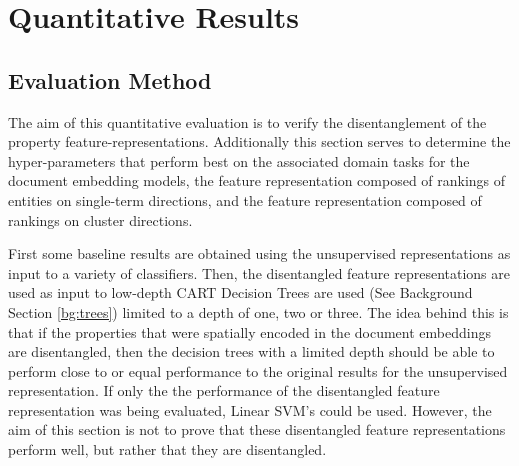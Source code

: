 

\section{Quantitative Results}

\subsection{Evaluation Method}

The aim of this quantitative evaluation is to verify the disentanglement of the property feature-representations. Additionally this section serves to determine the hyper-parameters that perform best on the associated domain tasks for the document embedding models, the feature representation composed of rankings of entities on single-term directions, and the feature representation composed of rankings on cluster directions. 

First some baseline results are obtained using the unsupervised representations as input to a variety of classifiers. Then,  the disentangled feature representations are used as input to low-depth  CART Decision Trees  are used (See Background Section \ref{bg:trees}) limited to a depth of one, two or three. The idea behind this is that if the properties that were spatially encoded in the  document embeddings  are disentangled, then the decision trees with a limited depth should be able to perform close to or equal performance to the original results for the unsupervised representation.  If only the the performance of the disentangled feature representation was being evaluated, Linear SVM's could be used. However, the aim of this section is not to prove that these disentangled feature representations perform well, but rather that they are disentangled. 

